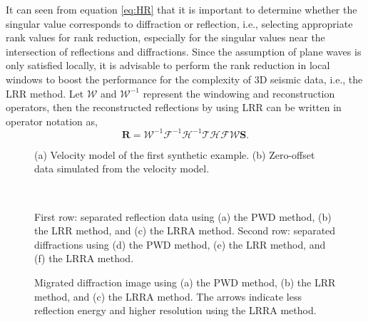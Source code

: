 \documentclass[10pt]{IEEEtran}
\begin{document}
It can seen from equation \ref{eq:HR} that it is important to determine whether the  singular value corresponds to diffraction or reflection, i.e., selecting appropriate rank values for rank reduction, especially for the singular values near the intersection of reflections and diffractions. Since the assumption of plane waves is only satisfied locally, it is advisable to perform the rank reduction in local windows to boost the performance for the complexity of 3D seismic data, i.e., the LRR method. Let $\mathcal{W}$ and $\mathcal{W}^{-1}$ represent the windowing and reconstruction operators, then the reconstructed reflections by using LRR can be written in operator notation as,
\begin{equation} \label{eq:wr}
\mathbf{R}=\mathcal{W}^{-1}\mathcal{F}^{-1} \mathcal{H}^{-1} \mathcal{T}\mathcal{H}\mathcal{F}\mathcal{W}\mathbf{S}.
\end{equation}


\begin{figure}[htb!]
 \centering
\caption{(a) Velocity model of the first synthetic example. (b) Zero-offset data simulated from the velocity model.}
\label{fig:ovp,o}
\end{figure}

\begin{figure}[htb!]
 \centering
  \\
\caption{First row: separated reflection data using (a) the PWD method, (b) the LRR method, and (c) the LRRA method. Second row: separated diffractions using (d) the PWD method, (e) the LRR method, and (f) the LRRA method.}
\label{fig:o-pwd,o-lrr,o-lrra,o-pwd-n-0,o-lrr-n-0,o-lrra-n-0}
\end{figure}

\begin{figure}[htb!]
 \centering
\caption{Migrated diffraction image using (a) the PWD method, (b) the LRR method, and (c) the LRRA method. The arrows indicate less reflection energy and higher resolution using the LRRA method.}
\label{fig:o-pwd-imag-0,o-lrr-imag-0,o-lrra-imag-0}
\end{figure}
\end{document}
